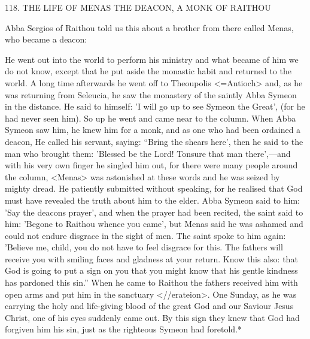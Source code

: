 118. THE LIFE OF MENAS THE DEACON,
A MONK OF RAITHOU

Abba Sergios of Raithou told us this about a brother from there
called Menas, who became a deacon:

He went out into the world to perform his ministry and what
became of him we do not know, except that he put aside the
monastic habit and returned to the world. A long time afterwards
he went off to Theoupolis <=Antioch> and, as he was returning
from Seleucia, he saw the monastery of the saintly Abba Symeon in
the distance. He said to himself: 'I will go up to see Symeon the
Great', (for he had never seen him). So up he went and came near
to the column. When Abba Symeon saw him, he knew him for a
monk, and as one who had been ordained a deacon, He called his
servant, saying: “Bring the shears here', then he said to the man who
brought them: 'Blessed be the Lord! Tonsure that man there',—and
with his very own finger he singled him out, for there were many
people around the column, <Menas> was astonished at these words
and he was seized by mighty dread. He patiently submitted without
speaking, for he realised that God must have revealed the truth
about him to the elder. Abba Symeon said to him: 'Say the deacon\textquotesingle s
prayer', and when the prayer had been recited, the saint said to him:
'Begone to Raithou whence you came', but Menas said he was
ashamed and could not endure disgrace in the sight of men. The
saint spoke to him again: 'Believe me, child, you do not have to feel
disgrace for this. The fathers will receive you with smiling faces and
gladness at your return. Know this also: that God is going to put a
sign on you that you might know that his gentle kindness has
pardoned this sin.” When he came to Raithou the fathers received
him with open arms and put him in the sanctuary <//erateion>.
One Sunday, as he was carrying the holy and life-giving blood of
the great God and our Saviour Jesus Christ, one of his eyes
suddenly came out. By this sign they knew that God had forgiven
him his sin, just as the righteous Symeon had foretold.*

